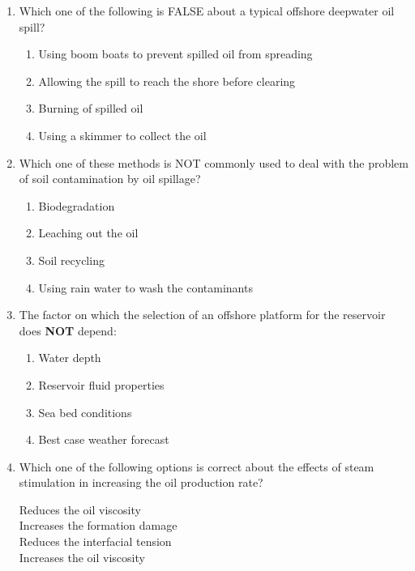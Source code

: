 \documentclass[journal,12pt,onecolumn]{IEEEtran}
\theoremstyle{remark}
\begin{document}
\begin{enumerate}
\pagebreak

\item Which one of the following is FALSE about a typical offshore deepwater oil spill?

\hfill{}

\begin{enumerate}
\item Using boom boats to prevent spilled oil from spreading
\item Allowing the spill to reach the shore before clearing
\item Burning of spilled oil
\item Using a skimmer to collect the oil
\end{enumerate}

\item Which one of these methods is NOT commonly used to deal with the problem of soil
contamination by oil spillage?\hfill{}
\begin{enumerate}
\item Biodegradation
\item Leaching out the oil
\item Soil recycling
\item Using rain water to wash the contaminants
\end{enumerate}

\item The factor on which the selection of an offshore platform for the reservoir does \textbf{NOT}
depend:

\hfill{}

\begin{enumerate}
\item Water depth
\item Reservoir fluid properties
\item Sea bed conditions
\item Best case weather forecast
\end{enumerate}

\item Which one of the following options is correct about the effects of steam stimulation in increasing the oil production rate?

\hfill{}

 Reduces the oil viscosity\\
 Increases the formation damage\\
 Reduces the interfacial tension\\
 Increases the oil viscosity


\end{enumerate}
\end{document}
